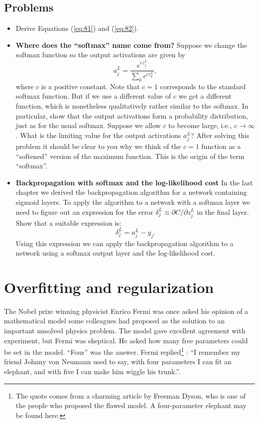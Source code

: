 \documentclass[a4paper,twoside,10pt]{book}
\begin{document}
\subsection*{Problems}
\begin{itemize}
\item Derive Equations (\ref{eq:81}) and (\ref{eq:82}).
\item \textbf{Where does the ``softmax'' name come from?} Suppose we change the softmax function so the output activations are given by
\begin{equation}
	a^L_j = \frac{e^{c z^L_j}}{\sum_k e^{c z^L_k}},\label{eq:83}
\end{equation}
where $c$ is a positive constant. Note that $c=1$ corresponds to the standard softmax function. But if we use a different value of $c$ we get a different function, which is nonetheless qualitatively rather similar to the softmax. In particular, show that the output activations form a probability distribution, just as for the usual softmax. Suppose we allow $c$ to become large, i.e., $c\to \infty$. What is the limiting value for the output activations $a^L_j$? After solving this problem it should be clear to you why we think of the $c=1$ function as a ``softened'' version of the maximum function. This is the origin of the term ``softmax''.
\item \textbf{Backpropagation with softmax and the log-likelihood cost} In the last chapter we derived the backpropagation algorithm for a network containing sigmoid layers. To apply the algorithm to a network with a softmax layer we need to figure out an expression for the error $\delta^L_j \equiv \partial C / \partial z^L_j$ in the final layer. Show that a suitable expression is:
\begin{equation}
\delta^L_j = a^L_j -y_j. \label{eq:84}
\end{equation}
Using this expression we can apply the backpropagation algorithm to a network using a softmax output layer and the log-likelihood cost.
\end{itemize}

\section{Overfitting and regularization}
The Nobel prize winning physicist Enrico Fermi was once asked his opinion of a mathematical model some colleagues had proposed as the solution to an important unsolved physics problem. The model gave excellent agreement with experiment, but Fermi was skeptical. He asked how many free parameters could be set in the model. ``Four'' was the answer. Fermi replied\footnote{The quote comes from a charming article by Freeman Dyson, who is one of the people who proposed the flawed model. A four-parameter elephant may be found here.} : ``I remember my friend Johnny von Neumann used to say, with four parameters I can fit an elephant, and with five I can make him wiggle his trunk.''.
\end{document}
